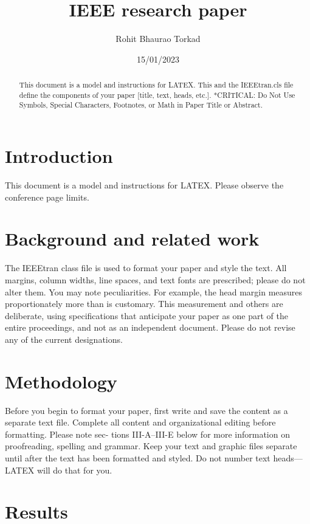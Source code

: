 \documentclass[conference]{IEEEtran}
\author{Rohit Bhaurao Torkad}
\date{15/01/2023}
\title{IEEE research paper}
\author{\IEEEauthorblockN{Rohit Torkad}
	\IEEEauthorblockA{Department of Computer Science\\
		abc@gamil.com}
	\and
	\IEEEauthorblockN{Rushikesh Chavan}
	\IEEEauthorblockA{Department of Mechanical Engineering\\
		xyz.gmail.com}}
\begin{document}
	
	\maketitle
	
	\begin{abstract}
		This document is a model and instructions for
		LATEX. This and the IEEEtran.cls file define the components of
		your paper [title, text, heads, etc.]. *CRITICAL: Do Not Use
		Symbols, Special Characters, Footnotes, or Math in Paper Title
		or Abstract.
	\end{abstract}
	
	\section{Introduction}
	
	This document is a model and instructions for LATEX. Please
	observe the conference page limits.
	
	\section{Background and related work}
	
	The IEEEtran class file is used to format your paper and
	style the text. All margins, column widths, line spaces, and
	text fonts are prescribed; please do not alter them. You may
	note peculiarities. For example, the head margin measures
	proportionately more than is customary. This measurement and
	others are deliberate, using specifications that anticipate your
	paper as one part of the entire proceedings, and not as an
	independent document. Please do not revise any of the current
	designations.
	
	\section{Methodology}

	Before you begin to format your paper, first write and
	save the content as a separate text file. Complete all content
	and organizational editing before formatting. Please note sec-
	tions III-A–III-E below for more information on proofreading,
	spelling and grammar.
	Keep your text and graphic files separate until after the text
	has been formatted and styled. Do not number text heads—
	LATEX will do that for you.
	
	\section{Results}
	
\end{document}

